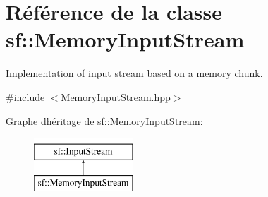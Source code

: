 \hypertarget{classsf_1_1MemoryInputStream}{}\section{Référence de la classe sf\+:\+:Memory\+Input\+Stream}
\label{classsf_1_1MemoryInputStream}


Implementation of input stream based on a memory chunk.  




{\ttfamily \#include $<$Memory\+Input\+Stream.\+hpp$>$}

Graphe d\textquotesingle{}héritage de sf\+:\+:Memory\+Input\+Stream\+:\begin{figure}[H]
\begin{center}
\leavevmode
\includegraphics[height=2.000000cm]{classsf_1_1MemoryInputStream}
\end{center}
\end{figure}
